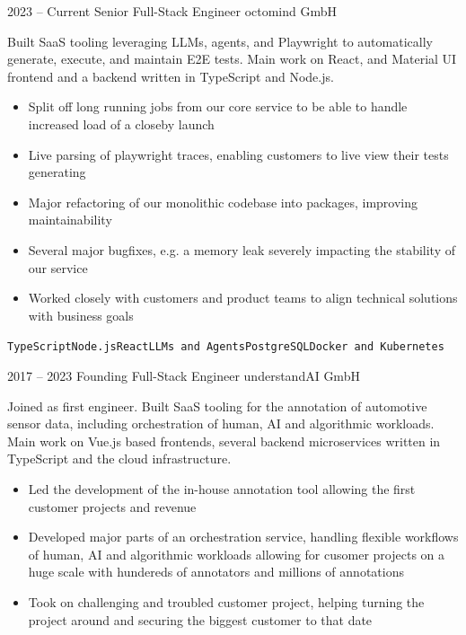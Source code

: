 \documentclass[8pt]{developercv} %
\newcommand{\linebreaksmall}{\vspace{2mm}}
\begin{document}

\begin{entrylist}
	\entry
		{2023 -- Current}
		{Senior Full-Stack Engineer}
		{octomind GmbH}
		{Built SaaS tooling leveraging LLMs, agents, and Playwright to automatically generate, execute, and maintain E2E tests. Main work on React, and Material UI frontend and a backend written in TypeScript and Node.js.
		\begin{itemize}[nosep, topsep=0pt, left=5pt, after=\vspace{6pt}]
			\item Split off long running jobs from our core service to be able to handle increased load of a closeby launch
			\item Live parsing of playwright traces, enabling customers to live view their tests generating
			\item Major refactoring of our monolithic codebase into packages, improving maintainability
			\item Several major bugfixes, e.g. a memory leak severely impacting the stability of our service
			\item Worked closely with customers and product teams to align technical solutions with business goals
		\end{itemize}
		\texttt{TypeScript}\slashsep\texttt{Node.js}\slashsep\texttt{React}\slashsep\texttt{LLMs and Agents}\slashsep\texttt{PostgreSQL}\slashsep\texttt{Docker and Kubernetes}} \linebreaksmall
	\entry
		{2017 -- 2023}
		{Founding Full-Stack Engineer}
		{understandAI GmbH}
		{Joined as first engineer. Built SaaS tooling for the annotation of automotive sensor data, including orchestration of human, AI and algorithmic workloads. Main work on Vue.js based frontends, several backend microservices written in TypeScript and the cloud infrastructure.
		\begin{itemize}[nosep, topsep=0pt, left=5pt, after=\vspace{6pt}]
			\item Led the development of the in-house annotation tool allowing the first customer projects and revenue
			\item Developed major parts of an orchestration service, handling flexible workflows of human, AI and algorithmic workloads allowing for cusomer projects on a huge scale with hundereds of annotators and millions of annotations
			\item Took on challenging and troubled customer project, helping turning the project around and securing the biggest customer to that date

\end{itemize}}
\end{entrylist}
\end{document}

